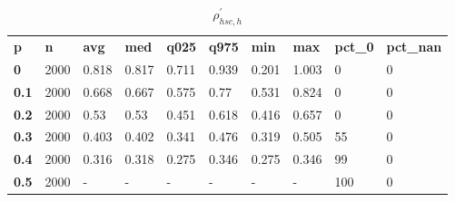 \begin{table}[h]
 \centering 
\footnotesize
\caption{$\rho_{hsc,h}^\prime $}
\label{tab:alphahsch}
\begin{tabular}[h]{| l l l l l l l l l l|
    } \hline
\textbf{ p} & \textbf{ n} & \textbf{ avg} & \textbf{ med} & \textbf{ q025} & \textbf{ q975} & \textbf{ min} & \textbf{ max} & \textbf{ pct\_0} & \textbf{ pct\_nan}
           \\
  \textbf{  0} & 2000 & 0.818 & 0.817 & 0.711 & 0.939 & 0.201 & 1.003 &   0 & 0
           \\
  \textbf{0.1} & 2000 & 0.668 & 0.667 & 0.575 &  0.77 & 0.531 & 0.824 &   0 & 0
           \\
  \textbf{0.2} & 2000 &  0.53 &  0.53 & 0.451 & 0.618 & 0.416 & 0.657 &   0 & 0
           \\
  \textbf{0.3} & 2000 & 0.403 & 0.402 & 0.341 & 0.476 & 0.319 & 0.505 &  55 & 0
           \\
  \textbf{0.4} & 2000 & 0.316 & 0.318 & 0.275 & 0.346 & 0.275 & 0.346 &  99 & 0
           \\
  \textbf{0.5} & 2000 & - & - & - & - & - & - & 100 & 0
           \\
 \hline \end{tabular}
 \end{table}
